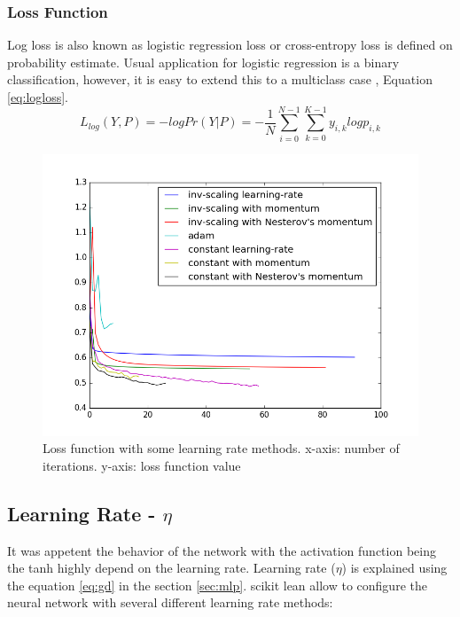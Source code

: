 \subsubsection{Loss Function}

Log loss is also known as logistic regression loss or cross-entropy loss is defined on probability estimate. Usual application for logistic regression is a binary classification, however, it is easy to extend this to a multiclass case \cite{bishop2006pattern}, Equation \ref{eq:logloss}. 
\begin{equation}
L_{log}(Y, P) = -logPr(Y|P) = -\frac{1}{N}\sum_{i=0}^{N-1}\sum_{k=0}^{K-1}y_{i, k}log p_{i, k}
\label{eq:logloss}
\end{equation}


\begin{figure}[!h]
\begin{center}
        \includegraphics[width=0.5\textheight]{img/activation_functions_1.png}
        \caption{Loss function with some learning rate methods. x-axis: number of iterations. y-axis: loss function value}  \label{fig:loss_functions}
\end{center}
\end{figure}


\subsection{Learning Rate - $\eta$}
It was appetent the behavior of the network with the activation function being the tanh highly depend on the learning rate. Learning rate ($\eta$) is explained using the equation \ref{eq:gd} in the section \ref{sec:mlp}. scikit lean allow to configure the neural network with several different learning rate methods: 


